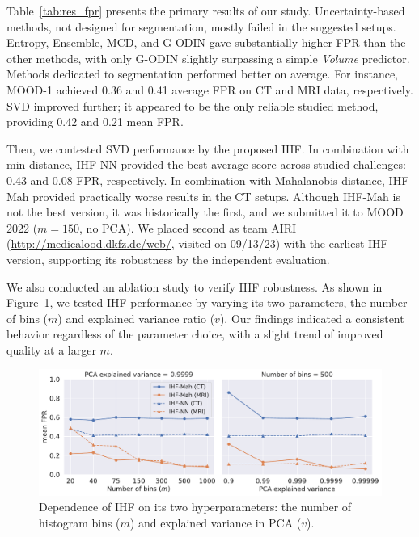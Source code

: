 Table~\ref{tab:res_fpr} presents the primary results of our study. Uncertainty-based methods, not designed for segmentation, mostly failed in the suggested setups. Entropy, Ensemble, MCD, and G-ODIN gave substantially higher FPR than the other methods, with only G-ODIN slightly surpassing a simple \textit{Volume} predictor. Methods dedicated to segmentation performed better on average. For instance, MOOD-1 achieved 0.36 and 0.41 average FPR on CT and MRI data, respectively. SVD improved further; it appeared to be the only reliable studied method, providing 0.42 and 0.21 mean FPR.



Then, we contested SVD performance by the proposed IHF. In combination with min-distance, IHF-NN provided the best average score across studied challenges: 0.43 and 0.08 FPR, respectively. In combination with Mahalanobis distance, IHF-Mah provided practically worse results in the CT setups. Although IHF-Mah is not the best version, it was historically the first, and we submitted it to MOOD 2022 ($m=150$, no PCA). We placed second as team AIRI (\url{http://medicalood.dkfz.de/web/}, visited on 09/13/23) with the earliest IHF version, supporting its robustness by the independent evaluation.

We also conducted an ablation study to verify IHF robustness. As shown in Figure~\ref{fig:ihf_hyp}, we tested IHF performance by varying its two parameters, the number of bins ($m$) and explained variance ratio ($v$). Our findings indicated a consistent behavior regardless of the parameter choice, with a slight trend of improved quality at a larger $m$.

\begin{figure}[h]
	\centering
	\includegraphics[width=\linewidth]{Dissertation/Figures/5_ood_bench/ihf_hyp_gost.pdf}
	\caption{Dependence of IHF on its two hyperparameters: the number of histogram bins ($m$) and explained variance in PCA ($v$).}%
\label{fig:ihf_hyp}
\end{figure}

